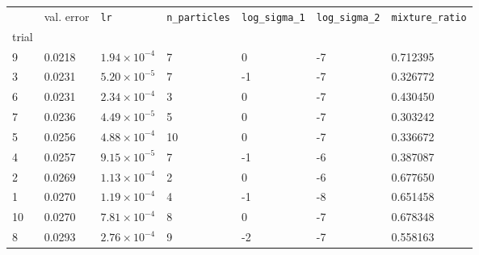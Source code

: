 \begin{tabular}{lp{2.3cm}p{2.3cm}p{2.3cm}p{2.3cm}p{2.3cm}p{2.3cm}}
\toprule
{} &  val. error &         \texttt{lr} &  \texttt{n\_particles} &  \texttt{log\_sigma\_1} &  \texttt{log\_sigma\_2} &  \texttt{mixture\_ratio} \\
trial &             &                     &                        &                         &                         &                          \\
\midrule
9     &      0.0218 & $1.94\times10^{-4}$ &                      7 &                       0 &                      -7 &                 0.712395 \\
3     &      0.0231 & $5.20\times10^{-5}$ &                      7 &                      -1 &                      -7 &                 0.326772 \\
6     &      0.0231 & $2.34\times10^{-4}$ &                      3 &                       0 &                      -7 &                 0.430450 \\
7     &      0.0236 & $4.49\times10^{-5}$ &                      5 &                       0 &                      -7 &                 0.303242 \\
5     &      0.0256 & $4.88\times10^{-4}$ &                     10 &                       0 &                      -7 &                 0.336672 \\
4     &      0.0257 & $9.15\times10^{-5}$ &                      7 &                      -1 &                      -6 &                 0.387087 \\
2     &      0.0269 & $1.13\times10^{-4}$ &                      2 &                       0 &                      -6 &                 0.677650 \\
1     &      0.0270 & $1.19\times10^{-4}$ &                      4 &                      -1 &                      -8 &                 0.651458 \\
10    &      0.0270 & $7.81\times10^{-4}$ &                      8 &                       0 &                      -7 &                 0.678348 \\
8     &      0.0293 & $2.76\times10^{-4}$ &                      9 &                      -2 &                      -7 &                 0.558163 \\
\bottomrule
\end{tabular}
